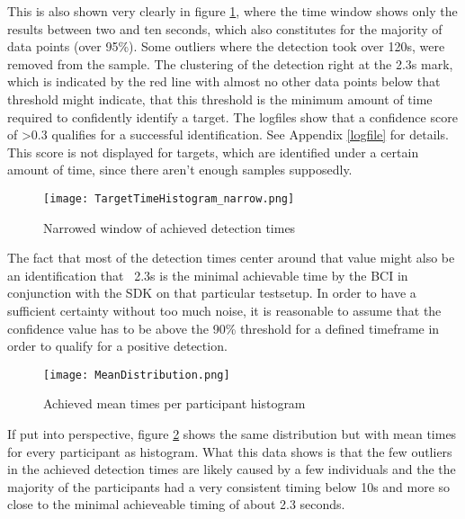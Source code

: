             This is also shown very clearly in figure \ref*{time-hist-narrow}, where the time window shows only the results between two and ten seconds, which also constitutes for the majority of data points (over 95\%). Some outliers where the detection took over 120s, were removed from the sample. The clustering of the detection right at the 2.3s mark, which is indicated by the red line with almost no other data points below that threshold might indicate, that this threshold is the minimum amount of time required to confidently identify a target. The logfiles show that a confidence score of >0.3 qualifies for a successful identification. See Appendix \ref*{logfile} for details. This score is not displayed for targets, which are identified under a certain amount of time, since there aren't enough samples supposedly.

            \begin{figure}[h]     %
                \centering
                \texttt{[image: TargetTimeHistogram\_narrow.png]} 
                \caption{Narrowed window of achieved detection times }\label{time-hist-narrow}
            \end{figure} 

            The fact that most of the detection times center around that value might also be an identification that ~2.3s is the minimal achievable time by the BCI in conjunction with the SDK on that particular testsetup. In order to have a sufficient certainty without too much noise, it is reasonable to assume that the confidence value has to be above the 90\% threshold for a defined timeframe in order to qualify for a positive detection.

            \begin{figure}[h]     %
                \centering
                \texttt{[image: MeanDistribution.png]} 
                \caption{Achieved mean times per participant histogram}\label{mean-dist}
            \end{figure} 

            If put into perspective, figure \ref*{mean-dist} shows the same distribution but with mean times for every participant as histogram. What this data shows is that the few outliers in the achieved detection times are likely caused by a few individuals and the the majority of the participants had a very consistent timing below 10s and more so close to the minimal achieveable timing of about 2.3 seconds.

